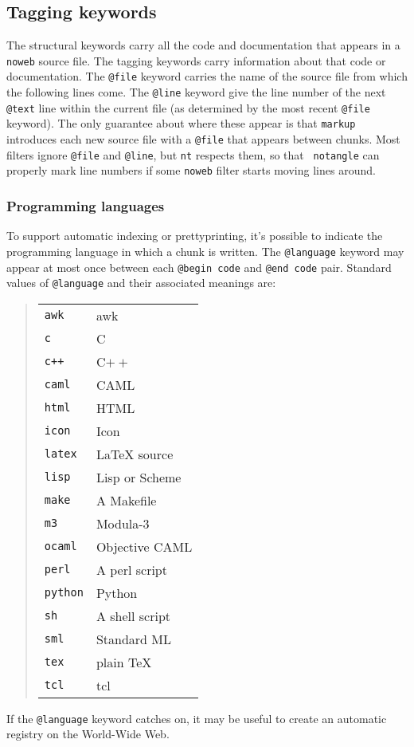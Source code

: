 \documentclass{article}
\makeatletter
\newcommand\kw[1]{\texttt{@#1}}
\makeatother
\begin{document}
\subsection{Tagging keywords}

The structural keywords carry all the code and documentation that
appears in a {\tt noweb} source file.
The tagging keywords carry information about that code or
documentation.
The \kw{file} keyword carries the name of the source file from which the
following lines come.
The \kw{line} keyword give the line number of the next \kw{text} line
within the current file (as determined by the most recent \kw{file}
keyword). 
The only guarantee about where these appear is that {\tt markup}
introduces each new source file with a \kw{file} that appears between
chunks.
Most filters ignore \kw{file} and \kw{line}, but {\tt nt}
respects them, so that {\tt
notangle} can properly mark line numbers if some {\tt noweb}
filter starts moving lines around.

\subsubsection{Programming languages}

To support automatic indexing or prettyprinting, it's possible to
indicate the programming language in which a chunk is written.
The \kw{language} keyword may appear at most once between
each \kw{begin~code} and \kw{end code} pair.
Standard values of \kw{language} and their associated meanings are:
\begin{quote}
\begin{tabularx}{\textwidth}{@{}>{\ttfamily}lX@{}}
\texttt{awk}&awk\\
\texttt{c}&C\\
\texttt{c++}&C$++$\\
\texttt{caml}&CAML\\
\texttt{html}&HTML\\
\texttt{icon}&Icon\\
\texttt{latex}&{\LaTeX} source\\
\texttt{lisp}&Lisp or Scheme\\
\texttt{make}&A Makefile\\
\texttt{m3}&Modula-3\\
\texttt{ocaml}&Objective CAML\\
\texttt{perl}&A perl script\\
\texttt{python}&Python\\
\texttt{sh}&A shell script\\
\texttt{sml}&Standard ML\\
\texttt{tex}&plain {\TeX}\\
\texttt{tcl}&tcl\\
\end{tabularx}
\end{quote}
If the \kw{language} keyword catches on, it may be useful to create an
automatic registry on the World-Wide Web.
\end{document}
